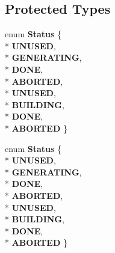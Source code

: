 \subsection*{Protected Types}
\begin{DoxyCompactItemize}
\item 
enum {\bfseries Status} \{ \\*
{\bfseries U\+N\+U\+S\+ED}, 
\\*
{\bfseries G\+E\+N\+E\+R\+A\+T\+I\+NG}, 
\\*
{\bfseries D\+O\+NE}, 
\\*
{\bfseries A\+B\+O\+R\+T\+ED}, 
\\*
{\bfseries U\+N\+U\+S\+ED}, 
\\*
{\bfseries B\+U\+I\+L\+D\+I\+NG}, 
\\*
{\bfseries D\+O\+NE}, 
\\*
{\bfseries A\+B\+O\+R\+T\+ED}
 \}\hypertarget{classv8_1_1internal_1_1_b_a_s_e___e_m_b_e_d_d_e_d_aa41d955c5807de96ccb4819b0f79ce78}{}\label{classv8_1_1internal_1_1_b_a_s_e___e_m_b_e_d_d_e_d_aa41d955c5807de96ccb4819b0f79ce78}

\item 
enum {\bfseries Status} \{ \\*
{\bfseries U\+N\+U\+S\+ED}, 
\\*
{\bfseries G\+E\+N\+E\+R\+A\+T\+I\+NG}, 
\\*
{\bfseries D\+O\+NE}, 
\\*
{\bfseries A\+B\+O\+R\+T\+ED}, 
\\*
{\bfseries U\+N\+U\+S\+ED}, 
\\*
{\bfseries B\+U\+I\+L\+D\+I\+NG}, 
\\*
{\bfseries D\+O\+NE}, 
\\*
{\bfseries A\+B\+O\+R\+T\+ED}
 \}\hypertarget{classv8_1_1internal_1_1_b_a_s_e___e_m_b_e_d_d_e_d_aa41d955c5807de96ccb4819b0f79ce78}{}\label{classv8_1_1internal_1_1_b_a_s_e___e_m_b_e_d_d_e_d_aa41d955c5807de96ccb4819b0f79ce78}

\end{DoxyCompactItemize}

